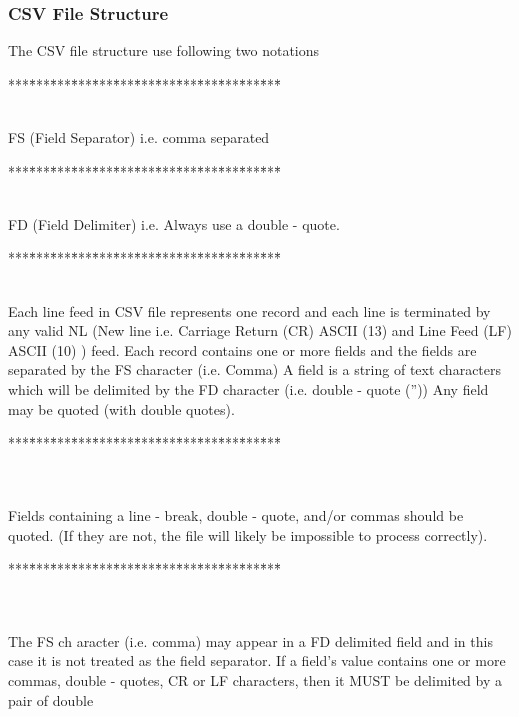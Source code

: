 \subsubsection{CSV File Structure}
The
CSV file structure use following
two
notations
\begin{tabbing}
***\=***\=***\=***\=***\=***\=***\=***\=***\=***\=***\=***\=***\=\kill
\\
\\
\end{tabbing}
FS (Field
Separator) i.e. comma separated
\begin{tabbing}
***\=***\=***\=***\=***\=***\=***\=***\=***\=***\=***\=***\=***\=\kill
\\
\\
\end{tabbing}
FD (Field Delimiter) i.e.  Always use a double
-
quote.
\begin{tabbing}
***\=***\=***\=***\=***\=***\=***\=***\=***\=***\=***\=***\=***\=\kill
\\
\\
\end{tabbing}
Each line feed in CSV file represents one record and each line is terminated by any valid
NL (New line
i.e. Carriage Return (CR)
ASCII (13)
and Line Feed (LF)
ASCII (10)
) feed.
Each
record
contains
one or more
fields and the fields are separated by the
FS character (i.e. Comma)
A field
is a string of text characters
which will be delimited
by the FD character (i.e. double
-
quote (''))
Any field may be quoted (with double quotes).
\begin{tabbing}
***\=***\=***\=***\=***\=***\=***\=***\=***\=***\=***\=***\=***\=\kill
\\
\\
\\
\end{tabbing}
Fields containing a line
-
break, double
-
quote, and/or commas should be quoted. (If they are not, the file
will likely be impossible to process correctly).
\begin{tabbing}
***\=***\=***\=***\=***\=***\=***\=***\=***\=***\=***\=***\=***\=\kill
\\
\\
\\
\end{tabbing}
The FS ch
aracter (i.e. comma) may appear in a FD delimited field and in this case it is not treated as
the field separator.
If a field's
value
contains one or more commas, double
-
quotes, CR or LF characters, then it MUST be
delimited by a pair of double
